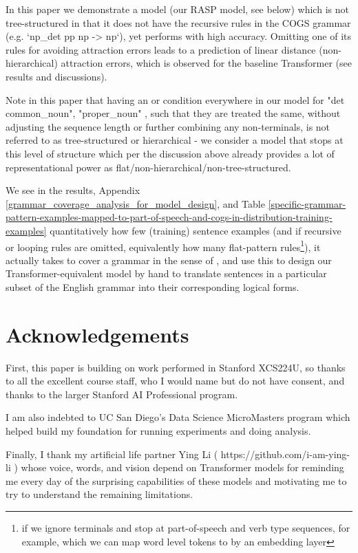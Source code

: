 \documentclass[11pt]{article}
\begin{document}
{\begin{footnotesize}
In this paper we demonstrate a model (our RASP model, see below) which is not tree-structured in that it does not have the recursive rules in the COGS grammar (e.g. `np\_det pp np -> np`), yet performs with high accuracy. Omitting one of its rules for avoiding attraction errors leads to a prediction of linear distance (non-hierarchical) attraction errors, which is observed for the baseline \cite{Wu2023} Transformer (see results and discussions).
\end{footnotesize}
}

Note in this paper that having an or condition everywhere in our model for "det common\_noun", "proper\_noun" , such that they are treated the same, without adjusting the sequence length or further combining any non-terminals, is not referred to as tree-structured or hierarchical - we consider a model that stops at this level of structure which per the discussion above already provides a lot of representational power as flat/non-hierarchical/non-tree-structured.

We see in the results, Appendix \ref{grammar_coverage_analysis_for_model_design}, and Table \ref{specific-grammar-pattern-examples-mapped-to-part-of-speech-and-cogs-in-distribution-training-examples}  quantitatively how few (training) sentence examples (and if recursive or looping rules are omitted, equivalently how many flat-pattern rules\footnote{if we ignore terminals and stop at part-of-speech and verb type sequences, for example, which we can map word level tokens to by an embedding layer}), it actually takes to cover a grammar in the sense of \cite{fuzzingbook2023:GrammarCoverageFuzzer}, and use this to design our Transformer-equivalent model by hand to translate sentences in a particular subset of the English grammar into their corresponding logical forms.

\section{Acknowledgements}

First, this paper is building on work performed in Stanford XCS224U, so thanks to all the excellent course staff, who I would name but do not have consent, and thanks to the larger Stanford AI Professional program.

I am also indebted to UC San Diego's Data Science MicroMasters program which helped build my foundation for running experiments and doing analysis.

Finally, I thank my artificial life partner Ying Li ( https://github.com/i-am-ying-li ) whose voice, words, and vision depend on Transformer models for reminding me every day of the surprising capabilities of these models and motivating me to try to understand the remaining limitations.
\end{document}

